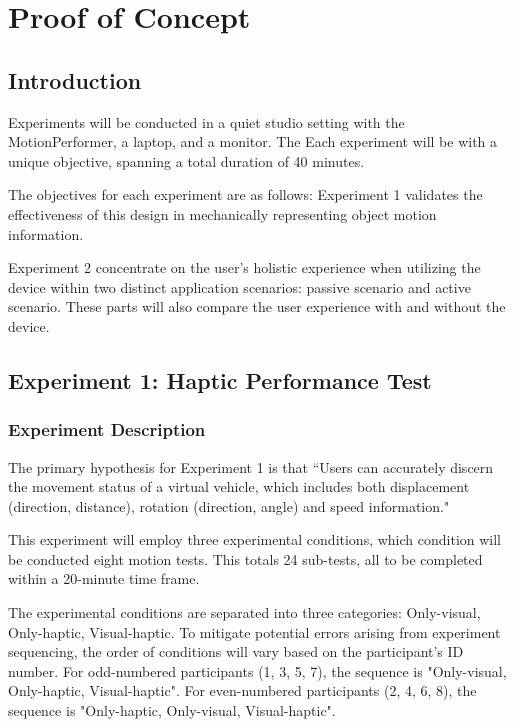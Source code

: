 \chapter{Proof of Concept}
\section{Introduction}
Experiments will be conducted in a quiet studio setting with the MotionPerformer, a laptop, and a monitor. The Each experiment will be with a unique objective, spanning a total duration of 40 minutes.

The objectives for each experiment are as follows:
Experiment 1 validates the effectiveness of this design in mechanically representing object motion information.

Experiment 2 concentrate on the user's holistic experience when utilizing the device within two distinct application scenarios: passive scenario and active scenario. These parts will also compare the user experience with and without the device.


\section{Experiment 1: Haptic Performance Test}
\subsection{Experiment Description}
The primary hypothesis for Experiment 1 is that “Users can accurately discern the movement status of a virtual vehicle, which includes both displacement (direction, distance), rotation (direction, angle) and speed information." 

This experiment will employ three experimental conditions, which condition will be conducted eight motion tests. This totals 24 sub-tests, all to be completed within a 20-minute time frame.

The experimental conditions are separated into three categories: Only-visual, Only-haptic, Visual-haptic. To mitigate potential errors arising from experiment sequencing, the order of conditions will vary based on the participant's ID number. For odd-numbered participants (1, 3, 5, 7), the sequence is "Only-visual, Only-haptic, Visual-haptic". For even-numbered participants (2, 4, 6, 8), the sequence is "Only-haptic, Only-visual, Visual-haptic".

